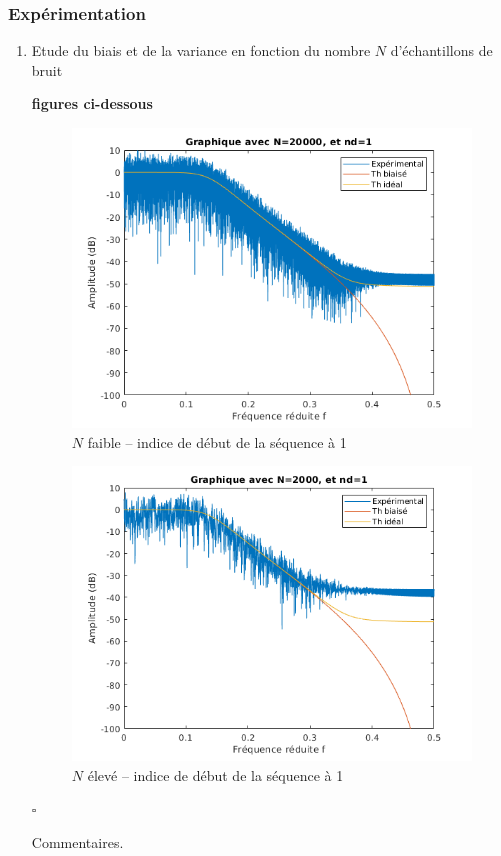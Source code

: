 \documentclass{article}
\newcommand{\debutrep}[1]{\color{blue}\begin{center} \hrulefill \textbf{ #1 } \hrulefill \end{center} }
\newcommand{\finrep}{\vspace*{5mm}\hfill $\square$\color{black}\vspace*{5mm}}
\begin{document}
\subsubsection{Expérimentation}

\begin{enumerate}
\renewcommand{\theenumi}{\Alph{enumi}}
\item Etude du biais et de la variance en fonction du nombre $N$ d'échantillons de bruit

\debutrep{figures ci-dessous}

\begin{figure}[H]
\centering
\includegraphics[width=0.75\columnwidth]{Variation-longueur-simple.png}
\caption{$N$ faible -- indice de début de la séquence à 1}
\end{figure}

\begin{figure}[H]
\centering
\includegraphics[width=0.75\columnwidth]{Variation-longueur-simple-2.png}
\caption{$N$ élevé -- indice de début de la séquence à 1}
\end{figure}
\finrep

Commentaires.


\end{enumerate}
\end{document}
